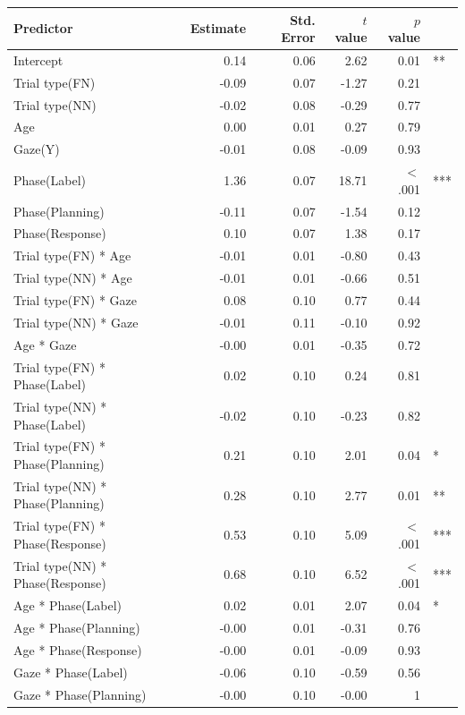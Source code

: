 \documentclass[a4paper,man,apacite,floatsintext]{apa6}
\begin{document}
\begin{table}[b]
\centering
\begin{tabular}{lrrrrl}
 Predictor & Estimate & Std. Error & $t$ value & $p$ value &  \\ 
  \hline
Intercept & 0.14 & 0.06 & 2.62 & 0.01 & ** \\ 
  Trial type(FN) & -0.09 & 0.07 & -1.27 & 0.21 &  \\ 
  Trial type(NN) & -0.02 & 0.08 & -0.29 & 0.77 &  \\ 
  Age & 0.00 & 0.01 & 0.27 & 0.79 &  \\ 
  Gaze(Y) & -0.01 & 0.08 & -0.09 & 0.93 &  \\ 
  Phase(Label) & 1.36 & 0.07 & 18.71 & $<$ .001 & *** \\ 
  Phase(Planning) & -0.11 & 0.07 & -1.54 & 0.12 &  \\ 
  Phase(Response) & 0.10 & 0.07 & 1.38 & 0.17 &  \\ 
  Trial type(FN) * Age & -0.01 & 0.01 & -0.80 & 0.43 &  \\ 
  Trial type(NN) * Age & -0.01 & 0.01 & -0.66 & 0.51 &  \\ 
  Trial type(FN) * Gaze & 0.08 & 0.10 & 0.77 & 0.44 &  \\ 
  Trial type(NN) * Gaze & -0.01 & 0.11 & -0.10 & 0.92 &  \\ 
  Age * Gaze & -0.00 & 0.01 & -0.35 & 0.72 &  \\ 
  Trial type(FN) * Phase(Label) & 0.02 & 0.10 & 0.24 & 0.81 &  \\ 
  Trial type(NN) * Phase(Label) & -0.02 & 0.10 & -0.23 & 0.82 &  \\ 
  Trial type(FN) * Phase(Planning) & 0.21 & 0.10 & 2.01 & 0.04 & * \\ 
  Trial type(NN) * Phase(Planning) & 0.28 & 0.10 & 2.77 & 0.01 & ** \\ 
  Trial type(FN) * Phase(Response) & 0.53 & 0.10 & 5.09 & $<$ .001 & *** \\ 
  Trial type(NN) * Phase(Response) & 0.68 & 0.10 & 6.52 & $<$ .001 & *** \\ 
  Age * Phase(Label) & 0.02 & 0.01 & 2.07 & 0.04 & * \\ 
  Age * Phase(Planning) & -0.00 & 0.01 & -0.31 & 0.76 &  \\ 
  Age * Phase(Response) & -0.00 & 0.01 & -0.09 & 0.93 &  \\ 
  Gaze * Phase(Label) & -0.06 & 0.10 & -0.59 & 0.56 &  \\ 
  Gaze * Phase(Planning) & -0.00 & 0.10 & -0.00 & 1 &  \\ 

\end{tabular}
\end{table}
\end{document}
